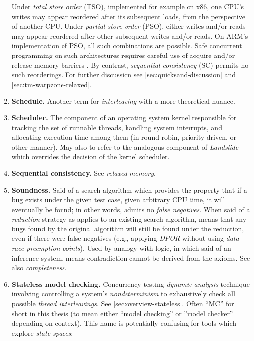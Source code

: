 \begin{enumerate}
{		Under {\em total store order} (TSO),
		implemented for example on x86,
		one CPU's writes may appear reordered after its subsequent loads, from the perspective of another CPU.
		Under {\em partial store order} (PSO),
		either writes and/or reads may appear reordered after other subsequent writes and/or reads.
		On ARM's implementation of PSO, all such combinations are possible.
		Safe concurrent programming on such architectures requires careful use
		of acquire and/or release memory barriers
		\cite{sully-thesis}.
		By contrast, {\em sequential consistency} (SC) permits no such reorderings.
		For further discussion see \cref{sec:quicksand-discussion} and \cref{sec:tm-warpzone-relaxed}.}
	\item {\bf Schedule.}
		Another term for {\em interleaving} with a more theoretical nuance.
	\item {\bf Scheduler.}
		The component of an operating system kernel responsible for tracking the set of runnable threads,
		handling system interrupts,
		and allocating execution time among them (in round-robin, priority-driven, or other manner).
		May also to refer to the analogous component of {\em Landslide}
		which overrides the decision of the kernel scheduler.
	\item {\bf Sequential consistency.} See {\em relaxed memory}.
	\item {\bf Soundness.}
		Said of a search algorithm
		which provides the property that if a bug exists under the given test case,
		given arbitrary CPU time,
		it will eventually be found;
		in other words, admits no {\em false negatives}.
		When said of a {\em reduction} strategy as applies to an existing search algorithm,
		means that any bugs found by the original algorithm will still be found under the reduction,
		even if there were false negatives
		(e.g., applying {\em DPOR} without using {\em data race preemption points}).
		Used by analogy with logic, in which said of an inference system,
		means contradiction cannot be derived from the axioms.
		See also {\em completeness}.
	\item {\bf Stateless model checking.}
		Concurrency testing {\em dynamic analysis} technique involving controlling a system's {\em nondeterminism}
		to exhaustively check all possible {\em thread interleavings}.
		See \cref{sec:overview-stateless}.
		Often ``MC'' for short in this thesis (to mean either ``model checking'' or ''model checker'' depending on context).
		This name is potentially confusing for tools which explore {\em state spaces}:

\end{enumerate}

